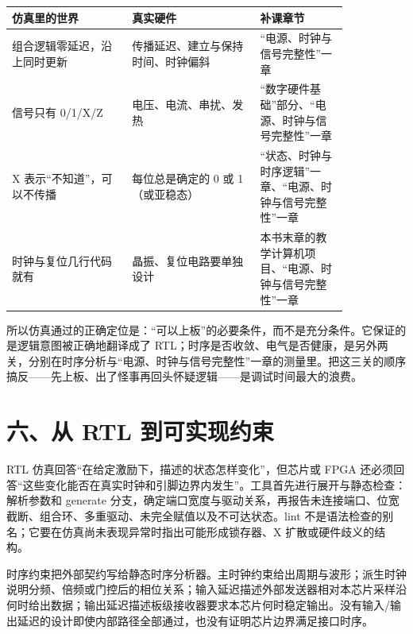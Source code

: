 \begin{longtable}{L{0.3\linewidth}L{0.32\linewidth}L{0.22\linewidth}}
\toprule
仿真里的世界 & 真实硬件 & 补课章节 \\
\midrule
组合逻辑零延迟，沿上同时更新 & 传播延迟、建立与保持时间、时钟偏斜 & “电源、时钟与信号完整性”一章 \\\tablerowrule
信号只有 0/1/X/Z & 电压、电流、串扰、发热 & “数字硬件基础”部分、“电源、时钟与信号完整性”一章 \\\tablerowrule
X 表示“不知道”，可以不传播 & 每位总是确定的 0 或 1（或亚稳态） & “状态、时钟与时序逻辑”一章、“电源、时钟与信号完整性”一章 \\\tablerowrule
时钟与复位几行代码就有 & 晶振、复位电路要单独设计 & 本书末章的教学计算机项目、“电源、时钟与信号完整性”一章 \\
\bottomrule
\end{longtable}

所以仿真通过的正确定位是：“可以上板”的必要条件，而不是充分条件。它保证的是逻辑意图被正确地翻译成了 RTL；时序是否收敛、电气是否健康，是另外两关，分别在时序分析与“电源、时钟与信号完整性”一章的测量里。把这三关的顺序搞反——先上板、出了怪事再回头怀疑逻辑——是调试时间最大的浪费。




























\section{六、从 RTL 到可实现约束}

RTL 仿真回答“在给定激励下，描述的状态怎样变化”，但芯片或 FPGA 还必须回答“这些变化能否在真实时钟和引脚边界内发生”。工具首先进行展开与静态检查：解析参数和 generate 分支，确定端口宽度与驱动关系，再报告未连接端口、位宽截断、组合环、多重驱动、未完全赋值以及不可达状态。lint 不是语法检查的别名；它要在仿真尚未表现异常时指出可能形成锁存器、X 扩散或硬件歧义的结构。

时序约束把外部契约写给静态时序分析器。主时钟约束给出周期与波形；派生时钟说明分频、倍频或门控后的相位关系；输入延迟描述外部发送器相对本芯片采样沿何时给出数据；输出延迟描述板级接收器要求本芯片何时稳定输出。没有输入/输出延迟的设计即使内部路径全部通过，也没有证明芯片边界满足接口时序。

